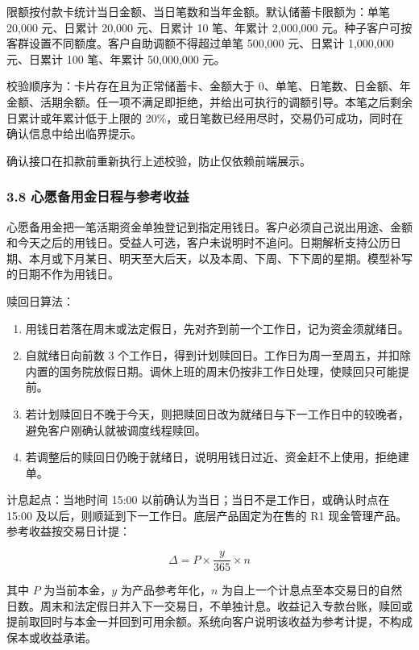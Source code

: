 \documentclass[
  a4paper,
  zihao=5,
  fontset=none]{ctexart}
\providecommand{\tightlist}{%
  \setlength{\itemsep}{0pt}\setlength{\parskip}{0pt}}
\begin{document}
限额按付款卡统计当日金额、当日笔数和当年金额。默认储蓄卡限额为：单笔
20,000 元、日累计 20,000 元、日累计 10 笔、年累计 2,000,000
元。种子客户可按客群设置不同额度。客户自助调额不得超过单笔 500,000
元、日累计 1,000,000 元、日累计 100 笔、年累计 50,000,000 元。

校验顺序为：卡片存在且为正常储蓄卡、金额大于
0、单笔、日笔数、日金额、年金额、活期余额。任一项不满足即拒绝，并给出可执行的调额引导。本笔之后剩余日累计或年累计低于上限的
20\%，或日笔数已经用尽时，交易仍可成功，同时在确认信息中给出临界提示。

确认接口在扣款前重新执行上述校验，防止仅依赖前端展示。

\subsubsection{3.8
心愿备用金日程与参考收益}\label{ux5fc3ux613fux5907ux7528ux91d1ux65e5ux7a0bux4e0eux53c2ux8003ux6536ux76ca}

心愿备用金把一笔活期资金单独登记到指定用钱日。客户必须自己说出用途、金额和今天之后的用钱日。受益人可选，客户未说明时不追问。日期解析支持公历日期、本月或下月某日、明天至大后天，以及本周、下周、下下周的星期。模型补写的日期不作为用钱日。

赎回日算法：

\begin{enumerate}
\def\labelenumi{\arabic{enumi}.}
\tightlist
\item
  用钱日若落在周末或法定假日，先对齐到前一个工作日，记为资金须就绪日。
\item
  自就绪日向前数 3
  个工作日，得到计划赎回日。工作日为周一至周五，并扣除内置的国务院放假日期。调休上班的周末仍按非工作日处理，使赎回只可能提前。
\item
  若计划赎回日不晚于今天，则把赎回日改为就绪日与下一工作日中的较晚者，避免客户刚确认就被调度线程赎回。
\item
  若调整后的赎回日仍晚于就绪日，说明用钱日过近、资金赶不上使用，拒绝建单。
\end{enumerate}

计息起点：当地时间 15:00 以前确认为当日；当日不是工作日，或确认时点在
15:00 及以后，则顺延到下一工作日。底层产品固定为在售的 R1
现金管理产品。参考收益按交易日计提：

\[
\Delta = P \times \frac{y}{365} \times n
\]

其中 \(P\) 为当前本金，\(y\) 为产品参考年化，\(n\)
为自上一个计息点至本交易日的自然日数。周末和法定假日并入下一交易日，不单独计息。收益记入专款台账，赎回或提前取回时与本金一并回到可用余额。系统向客户说明该收益为参考计提，不构成保本或收益承诺。
\end{document}
